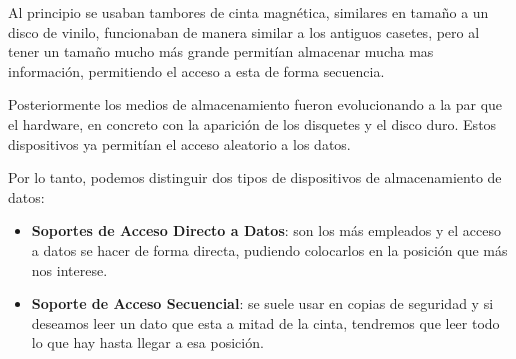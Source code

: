 Al principio se usaban tambores de cinta magnética, similares en tamaño a un disco de vinilo, funcionaban de manera similar a los antiguos casetes, pero al tener un tamaño mucho más grande permitían almacenar mucha mas información, permitiendo el acceso a esta de forma secuencia.

Posteriormente los medios de almacenamiento fueron evolucionando a la par que el hardware, en concreto con la aparición de los disquetes y el disco duro. Estos dispositivos ya permitían el acceso aleatorio a los datos.

Por lo tanto, podemos distinguir dos tipos de dispositivos de almacenamiento de datos:

\begin{itemize}
    \item \textbf{Soportes de Acceso Directo a Datos}: son los más empleados y el acceso a datos se hacer de forma directa, pudiendo colocarlos en la posición que más nos interese.
    \item \textbf{Soporte de Acceso Secuencial}: se suele usar en copias de seguridad y si deseamos leer un dato que esta a mitad de la cinta, tendremos que leer todo lo que hay hasta llegar a esa posición.
\end{itemize}


\glsaddall
\printglossaries


\newpage
{}



